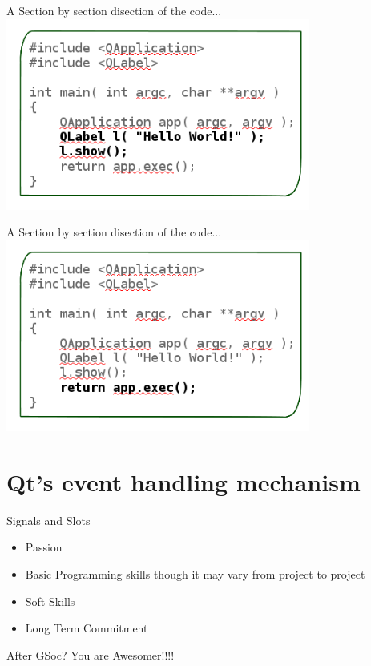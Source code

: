 \documentclass{beamer}
\begin{document}
\begin{frame}
A Section by section disection of the code...
\includegraphics[width=10cm]{helloworld4.png}
\end{frame}


\begin{frame}
A Section by section disection of the code...
\includegraphics[width=10cm]{helloworld5.png}
\end{frame}

\section{Qt's event handling mechanism}
\begin{frame}{Signals and Slots}
\begin{itemize}
\pause
\item Passion \pause
\item Basic Programming skills though it may vary from project to project \pause
\item Soft Skills \pause
\item Long Term Commitment
\end{itemize}
\end{frame}

\begin{frame}{After GSoc?}
\pause
You are Awesomer!!!!
\end{frame}
\end{document}
